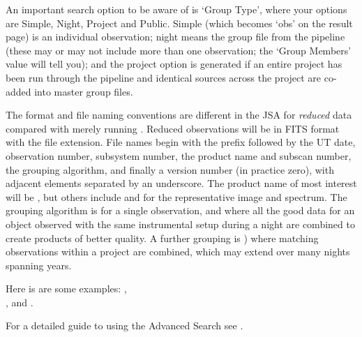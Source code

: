 \documentclass[11pt,oneside,chapters]{starlink}
\begin{document}
An important search option to be aware of is `Group Type', where your
options are Simple, Night, Project and Public. Simple (which becomes
`obs' on the result page) is an individual observation; night means
the group file from the pipeline (these may or may not include more
than one observation; the `Group Members' value will tell you); and the
project option is generated if an entire project has been run through
the pipeline and identical sources across the project are co-added
into master group files.

The format and file naming conventions are different in the JSA for
\emph{reduced} data compared with merely running \oracdr.  Reduced
observations will be in FITS format with the  file
extension.  File names begin with the  prefix followed by
the UT date, observation number, subsystem number, the product name
and subscan number, the grouping algorithm, and finally a version
number (in practice zero), with adjacent elements separated by an
underscore.  The product name of most interest will be ,
but others include  and  for the representative
image and spectrum.  The grouping algorithm is  for a single
observation, and  where all the good data for an object observed
with the same instrumental setup during a night are combined to create
products of better quality.  A further grouping is ) where
matching observations within a project are combined, which may extend
over many nights spanning years.

Here is are some examples:
, \\
, and
.

For a detailed guide to using the Advanced Search see
.


\clearpage
\end{document}
